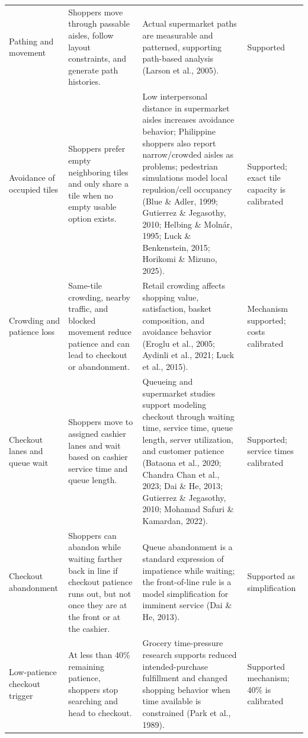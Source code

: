 \documentclass[12pt]{article}
\begin{document}
\begin{longtable}{>{\raggedright\arraybackslash}p{} >{\raggedright\arraybackslash}p{} >{\raggedright\arraybackslash}p{} >{\raggedright\arraybackslash}p{}}
Pathing and movement & Shoppers move through passable aisles, follow layout constraints, and generate path histories. & Actual supermarket paths are measurable and patterned, supporting path-based analysis (Larson et al., 2005). & Supported \\

Avoidance of occupied tiles & Shoppers prefer empty neighboring tiles and only share a tile when no empty usable option exists. & Low interpersonal distance in supermarket aisles increases avoidance behavior; Philippine shoppers also report narrow/crowded aisles as problems; pedestrian simulations model local repulsion/cell occupancy (Blue \& Adler, 1999; Gutierrez \& Jegasothy, 2010; Helbing \& Moln\'ar, 1995; Luck \& Benkenstein, 2015; Horikomi \& Mizuno, 2025). & Supported; exact tile capacity is calibrated \\

Crowding and patience loss & Same-tile crowding, nearby traffic, and blocked movement reduce patience and can lead to checkout or abandonment. & Retail crowding affects shopping value, satisfaction, basket composition, and avoidance behavior (Eroglu et al., 2005; Aydinli et al., 2021; Luck et al., 2015). & Mechanism supported; costs calibrated \\

Checkout lanes and queue wait & Shoppers move to assigned cashier lanes and wait based on cashier service time and queue length. & Queueing and supermarket studies support modeling checkout through waiting time, service time, queue length, server utilization, and customer patience (Bataona et al., 2020; Chandra Chan et al., 2023; Dai \& He, 2013; Gutierrez \& Jegasothy, 2010; Mohamad Safuri \& Kamardan, 2022). & Supported; service times calibrated \\

Checkout abandonment & Shoppers can abandon while waiting farther back in line if checkout patience runs out, but not once they are at the front or at the cashier. & Queue abandonment is a standard expression of impatience while waiting; the front-of-line rule is a model simplification for imminent service (Dai \& He, 2013). & Supported as simplification \\

Low-patience checkout trigger & At less than 40\% remaining patience, shoppers stop searching and head to checkout. & Grocery time-pressure research supports reduced intended-purchase fulfillment and changed shopping behavior when time available is constrained (Park et al., 1989). & Supported mechanism; 40\% is calibrated \\


\end{longtable}
\end{document}
